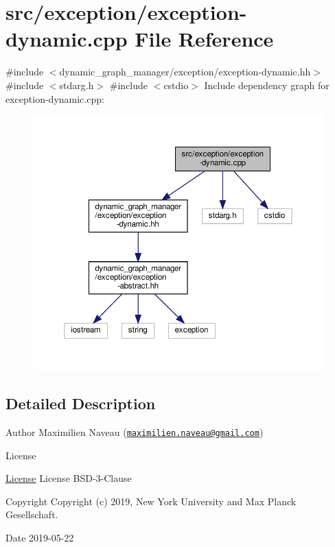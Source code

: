 \hypertarget{exception-dynamic_8cpp}{}\section{src/exception/exception-\/dynamic.cpp File Reference}
\label{exception-dynamic_8cpp}
{\ttfamily \#include $<$dynamic\+\_\+graph\+\_\+manager/exception/exception-\/dynamic.\+hh$>$}\newline
{\ttfamily \#include $<$stdarg.\+h$>$}\newline
{\ttfamily \#include $<$cstdio$>$}\newline
Include dependency graph for exception-\/dynamic.cpp\+:
\nopagebreak
\begin{figure}[H]
\begin{center}
\leavevmode
\includegraphics[width=350pt]{exception-dynamic_8cpp__incl}
\end{center}
\end{figure}


\subsection{Detailed Description}
\begin{DoxyAuthor}{Author}
Maximilien Naveau (\href{mailto:maximilien.naveau@gmail.com}{\tt maximilien.\+naveau@gmail.\+com}) 
\end{DoxyAuthor}
\begin{DoxyRefDesc}{License}
\item[\hyperlink{license__license000045}{License}]License B\+S\+D-\/3-\/\+Clause \end{DoxyRefDesc}
\begin{DoxyCopyright}{Copyright}
Copyright (c) 2019, New York University and Max Planck Gesellschaft. 
\end{DoxyCopyright}
\begin{DoxyDate}{Date}
2019-\/05-\/22 
\end{DoxyDate}
